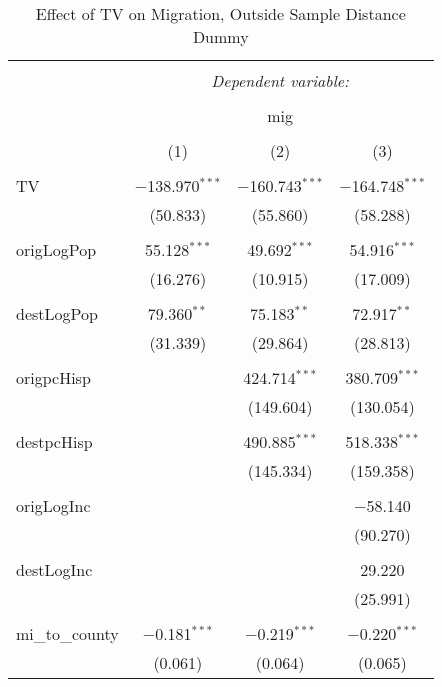
\begin{table}[!htbp] \centering 
  \caption{Effect of TV on Migration, Outside Sample Distance Dummy} 
  \label{} 
\begin{tabular}{@{\extracolsep{5pt}}lccc} 
\\[-1.8ex]\hline 
\hline \\[-1.8ex] 
 & \multicolumn{3}{c}{\textit{Dependent variable:}} \\ 
\cline{2-4} 
\\[-1.8ex] & \multicolumn{3}{c}{mig} \\ 
\\[-1.8ex] & (1) & (2) & (3)\\ 
\hline \\[-1.8ex] 
 TV & $-$138.970$^{***}$ & $-$160.743$^{***}$ & $-$164.748$^{***}$ \\ 
  & (50.833) & (55.860) & (58.288) \\ 
  & & & \\ 
 origLogPop & 55.128$^{***}$ & 49.692$^{***}$ & 54.916$^{***}$ \\ 
  & (16.276) & (10.915) & (17.009) \\ 
  & & & \\ 
 destLogPop & 79.360$^{**}$ & 75.183$^{**}$ & 72.917$^{**}$ \\ 
  & (31.339) & (29.864) & (28.813) \\ 
  & & & \\ 
 origpcHisp &  & 424.714$^{***}$ & 380.709$^{***}$ \\ 
  &  & (149.604) & (130.054) \\ 
  & & & \\ 
 destpcHisp &  & 490.885$^{***}$ & 518.338$^{***}$ \\ 
  &  & (145.334) & (159.358) \\ 
  & & & \\ 
 origLogInc &  &  & $-$58.140 \\ 
  &  &  & (90.270) \\ 
  & & & \\ 
 destLogInc &  &  & 29.220 \\ 
  &  &  & (25.991) \\ 
  & & & \\ 
 mi\_to\_county & $-$0.181$^{***}$ & $-$0.219$^{***}$ & $-$0.220$^{***}$ \\ 
  & (0.061) & (0.064) & (0.065) \\ 

\end{tabular}
\end{table}
